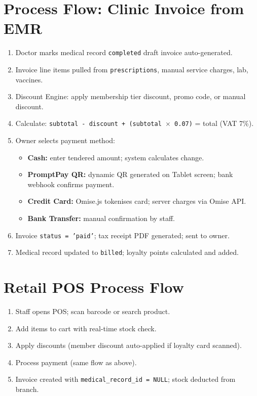 \documentclass[12pt,a4paper]{report}
\begin{document}
\section{Process Flow: Clinic Invoice from EMR}

\begin{enumerate}
  \item Doctor marks medical record \texttt{completed} \textrightarrow{} draft invoice auto-generated.
  \item Invoice line items pulled from \texttt{prescriptions}, manual service charges, lab, vaccines.
  \item Discount Engine: apply membership tier discount, promo code, or manual discount.
  \item Calculate: \texttt{subtotal - discount + (subtotal $\times$ 0.07)} = total (VAT 7\%).
  \item Owner selects payment method:
    \begin{itemize}
      \item \textbf{Cash:} enter tendered amount; system calculates change.
      \item \textbf{PromptPay QR:} dynamic QR generated on Tablet screen; bank webhook confirms payment.
      \item \textbf{Credit Card:} Omise.js tokenises card; server charges via Omise API.
      \item \textbf{Bank Transfer:} manual confirmation by staff.
    \end{itemize}
  \item Invoice \texttt{status = 'paid'}; tax receipt PDF generated; sent to owner.
  \item Medical record updated to \texttt{billed}; loyalty points calculated and added.
\end{enumerate}

\section{Retail POS Process Flow}

\begin{enumerate}
  \item Staff opens POS; scan barcode or search product.
  \item Add items to cart with real-time stock check.
  \item Apply discounts (member discount auto-applied if loyalty card scanned).
  \item Process payment (same flow as above).
  \item Invoice created with \texttt{medical\_record\_id = NULL}; stock deducted from branch.
\end{enumerate}
\end{document}
